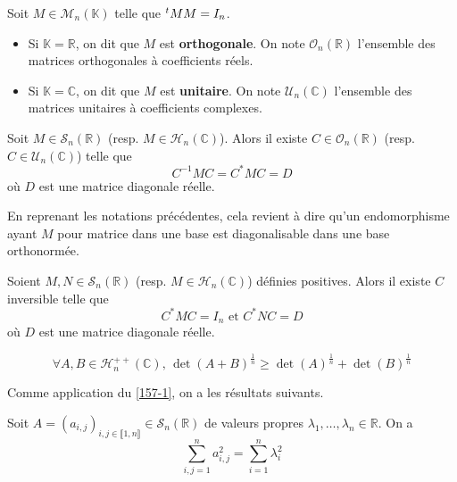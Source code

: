 
  \begin{definition}
    Soit $M \in \mathcal{M}_n(\mathbb{K})$ telle que $\mathstrut ^t MM = I_n$.
    \begin{itemize}
      \item Si $\mathbb{K} = \mathbb{R}$, on dit que $M$ est \textbf{orthogonale}. On note $\mathcal{O}_n(\mathbb{R})$ l'ensemble des matrices orthogonales à coefficients réels.
      \item Si $\mathbb{K} = \mathbb{C}$, on dit que $M$ est \textbf{unitaire}. On note $\mathcal{U}_n(\mathbb{C})$ l'ensemble des matrices unitaires à coefficients complexes.
    \end{itemize}
  \end{definition}

  \begin{theorem}[Spectral]
    \label{157-1}
    Soit $M \in \mathcal{S}_n(\mathbb{R})$ (resp. $M \in \mathcal{H}_n(\mathbb{C})$). Alors il existe $C \in \mathcal{O}_n(\mathbb{R})$ (resp. $C \in \mathcal{U}_n(\mathbb{C})$) telle que
    \[ C^{-1}MC = C^* M C = D \]
    où $D$ est une matrice diagonale réelle.
  \end{theorem}

  \begin{remark}
    En reprenant les notations précédentes, cela revient à dire qu'un endomorphisme ayant $M$ pour matrice dans une base est diagonalisable dans une base orthonormée.
  \end{remark}

  \begin{corollary}
    Soient $M, N \in \mathcal{S}_n(\mathbb{R})$ (resp. $M \in \mathcal{H}_n(\mathbb{C})$) définies positives. Alors il existe $C$ inversible telle que
    \[ C^*MC = I_n \text{ et } C^*NC = D \]
    où $D$ est une matrice diagonale réelle.
  \end{corollary}


  \begin{application}
    \[ \forall A, B \in \mathcal{H}_n^{++}(\mathbb{C}), \, \det(A+B)^{\frac{1}{n}} \geq \det(A)^{\frac{1}{n}} + \det(B)^{\frac{1}{n}} \]
  \end{application}


  Comme application du \cref{157-1}, on a les résultats suivants.

  \begin{application}
    Soit $A = (a_{i,j})_{i,j \in \llbracket 1, n \rrbracket} \in \mathcal{S}_n(\mathbb{R})$ de valeurs propres $\lambda_1, \dots, \lambda_n \in \mathbb{R}$. On a
    \[ \sum_{i,j = 1}^n a_{i,j}^2 = \sum_{i=1}^n \lambda_i^2 \]
  \end{application}

